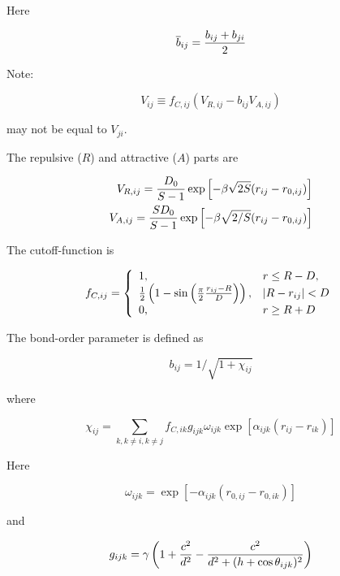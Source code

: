 \documentclass[a4paper,12pt,onecolumn]{article}
\begin{document}
Here

\begin{equation}
\overline{b}_{ij} = {b_{ij} + b_{ji} \over 2}
\end{equation}

Note:

\begin{equation}
V_{ij} \equiv  f_{C,ij} \left( V_{R,ij} - b_{ij} V_{A,ij} \right)
\end{equation}

may not be equal to $V_{ji}$.

The repulsive ($R$) and attractive ($A$) parts are

\begin{eqnarray}
  V_{R,ij} = {D_0 \over S-1} \exp\left[ - \beta \sqrt{2S} (r_{ij} -r_{0,ij})
  \right] \\
  V_{A,ij} = {S D_0 \over S-1} \exp\left[ - \beta \sqrt{2/S} (r_{ij} -r_{0,ij})
  \right]
\end{eqnarray}

The cutoff-function is

\begin{equation}
f_{C,ij} =
\left\{
\begin{array}{ll}
1,                   & r \leq R - D, \\
{1 \over 2} \left( 1 - \sin \left( {\pi \over 2} {r_{ij} - R \over D}
    \right) \right), & |R - r_{ij}| < D  \\
0,                   & r \geq R + D
\end{array}
\right.
\end{equation}

The bond-order parameter is defined as

\begin{equation}
b_{ij} = 1 / \sqrt{1 + \chi_{ij}}
\end{equation}

where

\begin{equation}
\chi_{ij} =
\sum_{k, k \neq i, k \neq j} f_{C,ik} g_{ijk} \omega_{ijk} \exp\left[
  \alpha_{ijk}(r_{ij} - r_{ik}) \right]
\end{equation}

Here

\begin{equation}
\omega_{ijk} = \exp\left[
- \alpha_{ijk} ( r_{0,ij} - r_{0,ik})
\right]
\end{equation}

and

\begin{equation}
g_{ijk} = \gamma \left(
1 + {c^2 \over d^2} - {c^2 \over d^2 + (h + \cos \theta_{ijk})^2}
\right)
\end{equation}
\end{document}
